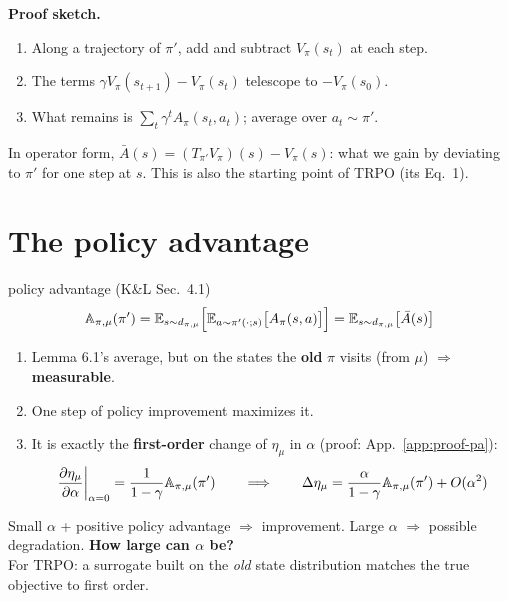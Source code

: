 \textbf{Proof sketch.}
\begin{enumerate}
  \item Along a trajectory of $\pi'$, add and subtract $V_\pi(s_t)$ at each step.
  \item The terms $\gamma V_\pi(s_{t+1})-V_\pi(s_t)$ telescope to $-V_\pi(s_0)$.
  \item What remains is $\sum_t\gamma^t A_\pi(s_t,a_t)$; average over $a_t\sim\pi'$.
\end{enumerate}
In operator form, $\bar A(s)=(T_{\pi'}V_\pi)(s)-V_\pi(s)$: what we gain by deviating to $\pi'$ for one step at $s$. This is also the starting point of TRPO (its Eq.~1).

\section{The policy advantage}
\label{sec:pa}

\begin{defbox}{policy advantage (K\&L Sec.~4.1)}
\begin{gather*}
  \mathbb{A}_{\pi,\mu}(\pi') = \mathbb{E}_{s\sim d_{\pi,\mu}}\Big[\mathbb{E}_{a\sim\pi'(\cdot;s)}\big[A_\pi(s,a)\big]\Big] = \mathbb{E}_{s\sim d_{\pi,\mu}}\big[\bar A(s)\big]
\end{gather*}
\end{defbox}

\begin{enumerate}
  \item Lemma 6.1's average, but on the states the \textbf{old} $\pi$ visits (from $\mu$) $\Rightarrow$ \textbf{measurable}.
  \item One step of policy improvement maximizes it.
  \item It is exactly the \textbf{first-order} change of $\eta_\mu$ in $\alpha$ (proof: App.~\ref{app:proof-pa}):
  \begin{gather*}
    \left.\frac{\partial \eta_\mu}{\partial \alpha}\right|_{\alpha=0} = \frac{1}{1-\gamma}\mathbb{A}_{\pi,\mu}(\pi')
    \qquad\Longrightarrow\qquad
    \Delta\eta_\mu = \frac{\alpha}{1-\gamma}\mathbb{A}_{\pi,\mu}(\pi') + O(\alpha^2)
  \end{gather*}
\end{enumerate}

\begin{keybox}
Small $\alpha$ + positive policy advantage $\Rightarrow$ improvement. Large $\alpha$ $\Rightarrow$ possible degradation. \textbf{How large can $\alpha$ be?}\\
For TRPO: a surrogate built on the \emph{old} state distribution matches the true objective to first order.
\end{keybox}

